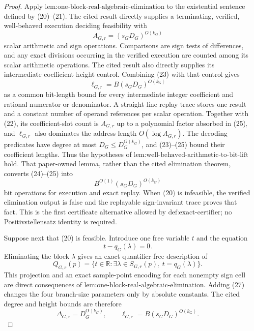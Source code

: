 \documentclass{article}
\begin{document}
\begin{proof}
Apply \(\text{lem:one-block-real-algebraic-elimination}\) to the existential sentence defined by (20)--(21).  The cited result directly supplies a terminating, verified, well-behaved execution deciding feasibility with
\[
A_{G,r}=(s_GD_G)^{O(k_G)}
\tag{24}
\]
scalar arithmetic and sign operations.  Comparisons are sign tests of differences, and any exact divisions occurring in the verified execution are counted among its scalar arithmetic operations.  The cited result also directly supplies its intermediate coefficient-height control.  Combining (23) with that control gives
\[
\ell_{G,r}=B(s_GD_G)^{O(k_G)}
\tag{25}
\]
as a common bit-length bound for every intermediate integer coefficient and rational numerator or denominator.  A straight-line replay trace stores one result and a constant number of operand references per scalar operation.  Together with (22), its coefficient-slot count is \(A_{G,r}\) up to a polynomial factor absorbed in (25), and \(\ell_{G,r}\) also dominates the address length \(O(\log A_{G,r})\).  The decoding predicates have degree at most \(D_G\le D_G^{O(k_G)}\), and (23)--(25) bound their coefficient lengths.  Thus the hypotheses of \(\text{lem:well-behaved-arithmetic-to-bit-lift}\) hold.  That paper-owned lemma, rather than the cited elimination theorem, converts (24)--(25) into
\[
B^{O(1)}(s_GD_G)^{O(k_G)}
\tag{26}
\]
bit operations for execution and exact replay.  When (20) is infeasible, the verified elimination output is false and the replayable sign-invariant trace proves that fact.  This is the first certificate alternative allowed by \(\text{def:exact-certifier}\); no Positivstellensatz identity is required.

Suppose next that (20) is feasible.  Introduce one free variable \(t\) and the equation
\[
t-q_G(\lambda)=0.
\tag{27}
\]
Eliminating the block \(\lambda\) gives an exact quantifier-free description of
\[
Q_{G,r}(p)=\{t\in\mathbb R:\exists\lambda\in S_{G,r}(p),\ t=q_G(\lambda)\}.
\tag{28}
\]
This projection and an exact sample-point encoding for each nonempty sign cell are direct consequences of \(\text{lem:one-block-real-algebraic-elimination}\).  Adding (27) changes the four branch-size parameters only by absolute constants.  The cited degree and height bounds are therefore
\[
\Delta_{G,r}=D_G^{O(k_G)},
\qquad
\ell_{G,r}=B(s_GD_G)^{O(k_G)}.
\tag{29}
\]


\end{proof}
\end{document}
